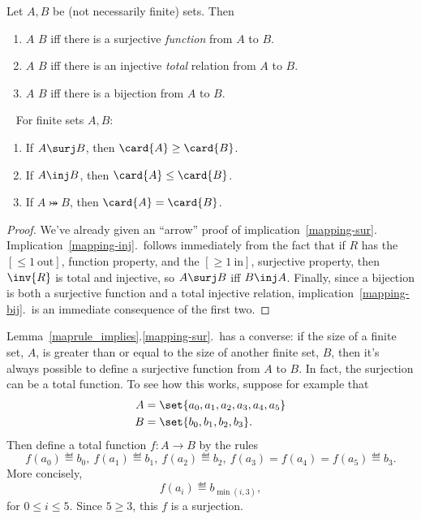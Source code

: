 \begin{definition}\label{bigger}
  Let $A,B$ be (not necessarily finite) sets.  Then
  \begin{enumerate}
  \item $A$ \term{$\surj$} $B$ iff there is a surjective
    \emph{function} from $A$ to $B$.

  \item $A$ \term{$\inj$} $B$ iff there is an injective
    \emph{total} relation from $A$ to $B$.

  \item $A$ \term{$\bij$} $B$ iff there is a bijection from $A$ to
    $B$.

  \end{enumerate}
\end{definition}

\begin{lemma}\label{maprule_implies}  \mbox{ }
For finite sets $A,B$:

\begin{enumerate}

\item\label{mapping-sur} If $A \surj B$, then $\card{A} \geq
  \card{B}$.

\item\label{mapping-inj} If $A \inj B$, then $\card{A} \leq \card{B}$.

\item\label{mapping-bij} If $A \bij B$, then $\card{A} = \card{B}$.
\end{enumerate}

\end{lemma}

\begin{proof}
 We've already given an ``arrow'' proof of
 implication~\ref{mapping-sur}.
 Implication~\ref{mapping-inj}.\ follows immediately from the fact
 that if $R$ has the $[\le 1\ \text{out}]$, function property, and the
 $[\ge 1\ \text{in}]$, surjective property, then $\inv{R}$ is total
 and injective, so $A \surj B$ iff $B \inj A$.  Finally, since a
 bijection is both a surjective function and a total injective
 relation, implication~\ref{mapping-bij}.\ is an immediate consequence
 of the first two.
\end{proof}

Lemma~\ref{maprule_implies}.\ref{mapping-sur}.\ has a converse: if the
size of a finite set, $A$, is greater than or equal to the size of
another finite set, $B$, then it's always possible to define a
surjective function from $A$ to $B$.  In fact, the surjection can be a
total function.  To see how this works, suppose for example that
\begin{align*}
A & =\set{a_0,a_1,a_2,a_3,a_4,a_5}\\ B & =\set{b_0,b_1,b_2,b_3}.
\end{align*}
Then define a total function $f:A\to B$ by the rules
\[
f(a_0) \eqdef b_0,\ f(a_1) \eqdef b_1,\ f(a_2) \eqdef b_2,\ f(a_3)=
f(a_4)=f(a_5) \eqdef b_3.
\]
More concisely,
\[
f(a_i) \eqdef b_{\min(i,3)},
\]
for $0 \le i \le 5$.  Since $5 \geq 3$, this $f$ is a surjection.
\iffalse In fact, if $A$ and $B$ are finite sets of the same size,
then we could also define a bijection from $A$ to $B$ by this method.
\fi 

